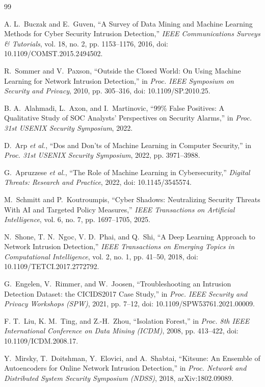 \documentclass[conference]{IEEEtran}
\begin{document}
\begin{thebibliography}{99}

 A. L.~Buczak and E.~Guven, ``A Survey of Data Mining and Machine Learning Methods for Cyber Security Intrusion Detection,'' \emph{IEEE Communications Surveys \& Tutorials}, vol. 18, no. 2, pp. 1153--1176, 2016, doi: 10.1109/COMST.2015.2494502.

 R.~Sommer and V.~Paxson, ``Outside the Closed World: On Using Machine Learning for Network Intrusion Detection,'' in \emph{Proc. IEEE Symposium on Security and Privacy}, 2010, pp. 305--316, doi: 10.1109/SP.2010.25.

 B. A.~Alahmadi, L.~Axon, and I.~Martinovic, ``99\% False Positives: A Qualitative Study of {SOC} Analysts' Perspectives on Security Alarms,'' in \emph{Proc. 31st USENIX Security Symposium}, 2022.

 D.~Arp \emph{et al.}, ``Dos and Don'ts of Machine Learning in Computer Security,'' in \emph{Proc. 31st USENIX Security Symposium}, 2022, pp. 3971--3988.

 G.~Apruzzese \emph{et al.}, ``The Role of Machine Learning in Cybersecurity,'' \emph{Digital Threats: Research and Practice}, 2022, doi: 10.1145/3545574.

 M.~Schmitt and P.~Koutroumpis, ``Cyber Shadows: Neutralizing Security Threats With {AI} and Targeted Policy Measures,'' \emph{IEEE Transactions on Artificial Intelligence}, vol. 6, no. 7, pp. 1697--1705, 2025.

 N.~Shone, T. N.~Ngoc, V. D.~Phai, and Q.~Shi, ``A Deep Learning Approach to Network Intrusion Detection,'' \emph{IEEE Transactions on Emerging Topics in Computational Intelligence}, vol. 2, no. 1, pp. 41--50, 2018, doi: 10.1109/TETCI.2017.2772792.

 G.~Engelen, V.~Rimmer, and W.~Joosen, ``Troubleshooting an Intrusion Detection Dataset: the {CICIDS2017} Case Study,'' in \emph{Proc. IEEE Security and Privacy Workshops (SPW)}, 2021, pp. 7--12, doi: 10.1109/SPW53761.2021.00009.

 F. T.~Liu, K. M.~Ting, and Z.-H.~Zhou, ``Isolation Forest,'' in \emph{Proc. 8th IEEE International Conference on Data Mining (ICDM)}, 2008, pp. 413--422, doi: 10.1109/ICDM.2008.17.

 Y.~Mirsky, T.~Doitshman, Y.~Elovici, and A.~Shabtai, ``Kitsune: An Ensemble of Autoencoders for Online Network Intrusion Detection,'' in \emph{Proc. Network and Distributed System Security Symposium (NDSS)}, 2018, arXiv:1802.09089.


\end{thebibliography}
\end{document}
